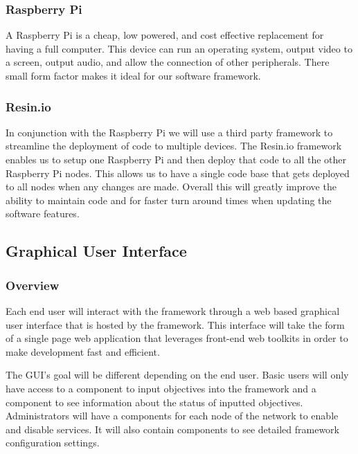 \subsubsection{Raspberry Pi}
A Raspberry Pi is a cheap, low powered, and cost effective replacement for having a full computer. This device can run an operating system, output video to a screen, output audio, and allow the connection of other peripherals. There small form factor makes it ideal for our software framework.

\subsubsection{Resin.io}
In conjunction with the Raspberry Pi we will use a third party framework to streamline the deployment of code to multiple devices. The Resin.io framework enables us to setup one Raspberry Pi and then deploy that code to all the other Raspberry Pi nodes. This allows us to have a single code base that gets deployed to all nodes when any changes are made. Overall this will greatly improve the ability to maintain code and for faster turn around times when updating the software features.




\subsection{Graphical User Interface}
\subsubsection{Overview}
Each end user will interact with the framework through a web based graphical user interface that is hosted by the framework. This interface will take the form of a single page web application that leverages front-end web toolkits in order to make development fast and efficient.

The GUI's goal will be different depending on the end user. Basic users will only have access to a component to input objectives into the framework and a component to see information about the status of inputted objectives. Administrators will have a components for each node of the network to enable and disable services. It will also contain components to see detailed framework configuration settings.

